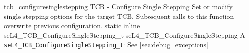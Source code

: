 %
%
%
%

\apidoc
{tcb_configuresinglestepping}
{TCB - Configure Single Stepping}
{Set or modify single stepping options for the target TCB. Subsequent calls to this
function overwrite previous configuration.}
{static inline seL4\_TCB\_ConfigureSingleStepping\_t seL4\_TCB\_ConfigureSingleStepping}
{
}
{A \texttt{seL4\_TCB\_ConfigureSingleStepping\_t}: \tcbconfiguresinglesteppingtdesc}
{See \autoref{sec:debug_exceptions}}
